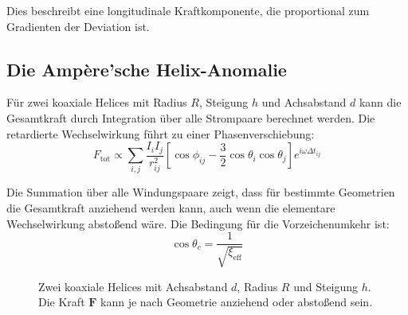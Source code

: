 \documentclass[10pt, a4paper]{article}
\begin{document}
	Dies beschreibt eine longitudinale Kraftkomponente, die proportional zum Gradienten der Deviation ist.
	
	\subsection{Die Ampère'sche Helix-Anomalie}
	Für zwei koaxiale Helices mit Radius $R$, Steigung $h$ und Achsabstand $d$ kann die Gesamtkraft durch Integration über alle Strompaare berechnet werden. Die retardierte Wechselwirkung führt zu einer Phasenverschiebung:
	\begin{equation}
		F_{\text{tot}} \propto \sum_{i,j} \frac{I_i I_j}{r_{ij}^2} \left[ \cos\phi_{ij} - \frac{3}{2} \cos\theta_i \cos\theta_j \right] e^{i\omega \Delta t_{ij}} \label{eq:helix_force}
	\end{equation}
	
	Die Summation über alle Windungspaare zeigt, dass für bestimmte Geometrien die Gesamtkraft anziehend werden kann, auch wenn die elementare Wechselwirkung abstoßend wäre. Die Bedingung für die Vorzeichenumkehr ist:
	\begin{equation}
		\cos\theta_c = \frac{1}{\sqrt{\xi_{\text{eff}}}} \label{eq:critical_angle}
	\end{equation}
	
	\begin{figure}[h]
		\centering
		\caption{Zwei koaxiale Helices mit Achsabstand $d$, Radius $R$ und Steigung $h$. Die Kraft $\mathbf{F}$ kann je nach Geometrie anziehend oder abstoßend sein.}
		\label{fig:helices}
	\end{figure}
	
\end{document}
